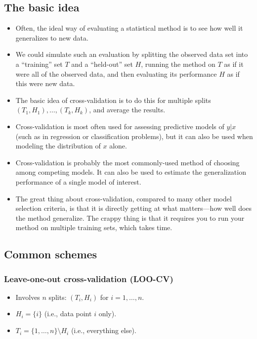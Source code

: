 \documentclass[12pt]{article}
\begin{document}
\subsection*{The basic idea}
\begin{itemize}
\item Often, the ideal way of evaluating a statistical method is to see how well it generalizes to new data.
\item We could simulate such an evaluation by splitting the observed data set into a ``training'' set $T$ and a ``held-out'' set $H$, running the method on $T$ as if it were all of the observed data, and then evaluating its performance $H$ as if this were new data.
\item The basic idea of cross-validation is to do this for multiple splits $(T_1,H_1),\ldots,(T_k,H_k)$, and average the results.
\item Cross-validation is most often used for assessing predictive models of $y|x$ (such as in regression or classification problems), but it can also be used when modeling the distribution of $x$ alone.
\item Cross-validation is probably the most commonly-used method of choosing among competing models. It can also be used to estimate the generalization performance of a single model of interest.
\item The great thing about cross-validation, compared to many other model selection criteria, is that it is directly getting at what matters---how well does the method generalize. The crappy thing is that it requires you to run your method on multiple training sets, which takes time.
\end{itemize}

\subsection*{Common schemes}
\subsubsection*{Leave-one-out cross-validation (LOO-CV)}
\begin{itemize}
\item Involves $n$ splits: $(T_i,H_i)$ for $i = 1,\ldots,n$.
\item $H_i = \{i \}$ (i.e., data point $i$ only).
\item $T_i = \{1,\ldots,n \} \setminus H_i$ (i.e., everything else).
\end{itemize}
\end{document}
